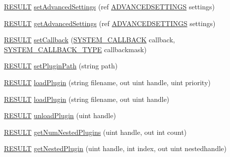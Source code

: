 \begin{DoxyCompactItemize}
\item 
\hyperlink{namespace_f_m_o_d_a305d1176ef3f8c8815861a60407ac33d}{R\+E\+S\+U\+LT} \hyperlink{class_f_m_o_d_1_1_system_a9a655c4aef76f1704cc54cc4ea73ea2d}{set\+Advanced\+Settings} (ref \hyperlink{struct_f_m_o_d_1_1_a_d_v_a_n_c_e_d_s_e_t_t_i_n_g_s}{A\+D\+V\+A\+N\+C\+E\+D\+S\+E\+T\+T\+I\+N\+GS} settings)
\item 
\hyperlink{namespace_f_m_o_d_a305d1176ef3f8c8815861a60407ac33d}{R\+E\+S\+U\+LT} \hyperlink{class_f_m_o_d_1_1_system_a6c760457cbe0c3fd59a363cb66367669}{get\+Advanced\+Settings} (ref \hyperlink{struct_f_m_o_d_1_1_a_d_v_a_n_c_e_d_s_e_t_t_i_n_g_s}{A\+D\+V\+A\+N\+C\+E\+D\+S\+E\+T\+T\+I\+N\+GS} settings)
\item 
\hyperlink{namespace_f_m_o_d_a305d1176ef3f8c8815861a60407ac33d}{R\+E\+S\+U\+LT} \hyperlink{class_f_m_o_d_1_1_system_ab5afef93b7bdd0f479aa2a8facb5cd20}{set\+Callback} (\hyperlink{namespace_f_m_o_d_aa2778e41871e1fdfe9ecae550d4a45eb}{S\+Y\+S\+T\+E\+M\+\_\+\+C\+A\+L\+L\+B\+A\+CK} callback, \hyperlink{namespace_f_m_o_d_aa5c808c3670f64c2b51ff4f216362a63}{S\+Y\+S\+T\+E\+M\+\_\+\+C\+A\+L\+L\+B\+A\+C\+K\+\_\+\+T\+Y\+PE} callbackmask)
\item 
\hyperlink{namespace_f_m_o_d_a305d1176ef3f8c8815861a60407ac33d}{R\+E\+S\+U\+LT} \hyperlink{class_f_m_o_d_1_1_system_a7ca34f3a64d08e03eb9683f006e68df2}{set\+Plugin\+Path} (string path)
\item 
\hyperlink{namespace_f_m_o_d_a305d1176ef3f8c8815861a60407ac33d}{R\+E\+S\+U\+LT} \hyperlink{class_f_m_o_d_1_1_system_a6be71008c7560442c4b2eece6fb3a5e0}{load\+Plugin} (string filename, out uint handle, uint priority)
\item 
\hyperlink{namespace_f_m_o_d_a305d1176ef3f8c8815861a60407ac33d}{R\+E\+S\+U\+LT} \hyperlink{class_f_m_o_d_1_1_system_a60d0f02bef548e7777a8d94b5d930ffd}{load\+Plugin} (string filename, out uint handle)
\item 
\hyperlink{namespace_f_m_o_d_a305d1176ef3f8c8815861a60407ac33d}{R\+E\+S\+U\+LT} \hyperlink{class_f_m_o_d_1_1_system_a2b43846b4153b5351616e62d556321e9}{unload\+Plugin} (uint handle)
\item 
\hyperlink{namespace_f_m_o_d_a305d1176ef3f8c8815861a60407ac33d}{R\+E\+S\+U\+LT} \hyperlink{class_f_m_o_d_1_1_system_aef00e8885fd82b48ede707f99592f0fb}{get\+Num\+Nested\+Plugins} (uint handle, out int count)
\item 
\hyperlink{namespace_f_m_o_d_a305d1176ef3f8c8815861a60407ac33d}{R\+E\+S\+U\+LT} \hyperlink{class_f_m_o_d_1_1_system_a96ab9f2453605260d95099282512405a}{get\+Nested\+Plugin} (uint handle, int index, out uint nestedhandle)

\end{DoxyCompactItemize}
